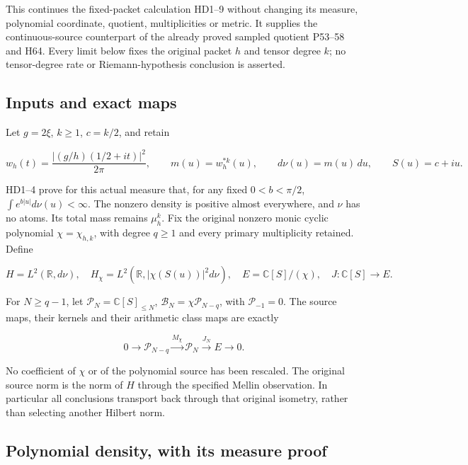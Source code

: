 \documentclass{article}
\begin{document}
\maketitle

This continues the fixed-packet calculation HD1--9 without changing its measure, polynomial coordinate, quotient, multiplicities or metric. It supplies the continuous-source counterpart of the already proved sampled quotient P53--58 and H64. Every limit below fixes the original packet \(h\) and tensor degree \(k\); no tensor-degree rate or Riemann-hypothesis conclusion is asserted.

\subsection{Inputs and exact maps}\label{inputs-and-exact-maps}

Let \(g=2\xi\), \(k\ge1\), \(c=k/2\), and retain

\[
w_h(t)=\frac{|(g/h)(1/2+it)|^2}{2\pi},\qquad
m(u)=w_h^{*k}(u),\qquad d\nu(u)=m(u)\,du,\qquad S(u)=c+iu.
\tag{CR1}
\]

HD1--4 prove for this actual measure that, for any fixed \(0<b<\pi/2\), \(\int e^{b|u|}d\nu(u)<\infty\). The nonzero density is positive almost everywhere, and \(\nu\) has no atoms. Its total mass remains \(\mu_h^k\). Fix the original nonzero monic cyclic polynomial \(\chi=\chi_{h,k}\), with degree \(q\ge1\) and every primary multiplicity retained. Define

\[
H=L^2(\mathbb R,d\nu),\quad H_\chi=L^2(\mathbb R,|\chi(S(u))|^2d\nu),
\quad E=\mathbb C[S]/(\chi),\quad J:\mathbb C[S]\longrightarrow E.
\tag{CR2}
\]

For \(N\ge q-1\), let \(\mathcal P_N=\mathbb C[S]_{\le N}\), \(\mathcal B_N=\chi\mathcal P_{N-q}\), with \(\mathcal P_{-1}=0\). The source maps, their kernels and their arithmetic class maps are exactly

\[
0\longrightarrow\mathcal P_{N-q}\xrightarrow{M_\chi}
\mathcal P_N\xrightarrow{J_N}E\longrightarrow0.
\tag{CR3}
\]

No coefficient of \(\chi\) or of the polynomial source has been rescaled. The original source norm is the norm of \(H\) through the specified Mellin observation. In particular all conclusions transport back through that original isometry, rather than selecting another Hilbert norm.

\subsection{Polynomial density, with its measure proof}\label{polynomial-density-with-its-measure-proof}
\end{document}
